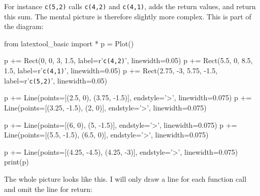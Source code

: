 For instance \texttt{c(5,2)} calls \texttt{c(4,2)} and \texttt{c(4,1)}, adds
the return values, and return this sum. The mental picture is therefore
slightly more complex. This is part of the diagram:

\begin{python}
from latextool_basic import *
p = Plot()

p += Rect(0, 0, 3, 1.5, label=r'\texttt{c(4,2)}', linewidth=0.05)
p += Rect(5.5, 0, 8.5, 1.5, label=r'\texttt{c(4,1)}', linewidth=0.05)
p += Rect(2.75, -3, 5.75, -1.5, label=r'\texttt{c(5,2)}', linewidth=0.05)

p += Line(points=[(2.5, 0), (3.75, -1.5)], endstyle='>', linewidth=0.075)
p += Line(points=[(3.25, -1.5), (2, 0)], endstyle='>', linewidth=0.075)

p += Line(points=[(6, 0), (5, -1.5)], endstyle='>', linewidth=0.075)
p += Line(points=[(5.5, -1.5), (6.5, 0)], endstyle='>', linewidth=0.075)

p += Line(points=[(4.25, -4.5), (4.25, -3)], endstyle='>', linewidth=0.075)
print(p)
\end{python}

The whole picture looks like this. I will only draw a line for each
function call and omit the line for return:

